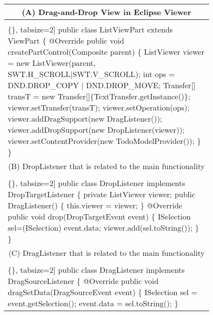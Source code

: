 \begin{figure}[!htb]
 \begin{minipage}{0.47\textwidth}
\scriptsize 
\begin{tabular}{@{}p{}} 
 \hline 
  \multicolumn{1}{c}{(A) Drag-and-Drop View in Eclipse Viewer } \\ \hline
  \vspace{-4mm}
\begin{Verbatim}[commandchars=\\\{\}, tabsize=2]
public class ListViewPart extends ViewPart \{
  @Override
  public void createPartControl(Composite parent) \{
    ListViewer viewer = new ListViewer(parent, 
       SWT.H_SCROLL|SWT.V_SCROLL);
    int ops = DND.DROP_COPY | DND.DROP_MOVE;
    Transfer[] transT = new Transfer[]\{TextTransfer.getInstance()\};
    viewer.setTransfer(transT);
    viewer.setOperation(ops);
    viewer.addDragSupport(new DragListener());
    viewer.addDropSupport(new DropListener(viewer));
    viewer.setContentProvider(new TodoModelProvider());
  \} \}
\end{Verbatim}
\vspace{-4mm}
 \\ \hline
  \multicolumn{1}{c}{(B) DropListener that is related to the main functionality } \\ \hline
    \vspace{-4mm}
\begin{Verbatim}[commandchars=\\\{\}, tabsize=2]
public class DropListener implements DropTargetListener \{
  private ListViewer viewer;
  public DragListener() 
  \{ this.viewer = viewer; \}
 @Override
    public void drop(DropTargetEvent event) \{
        ISelection sel=(ISelection) event.data;
        viewer.add(sel.toString());
   \} \}
 \end{Verbatim}
   \vspace{-4mm}
  \\ \hline
   \multicolumn{1}{c}{(C) DragListener that is related to the main functionality} \\ \hline
  \vspace{-4mm}
\begin{Verbatim}[commandchars=\\\{\}, tabsize=2]
public class DragListener implements DragSourceListener \{
   @Override
  public void dragSetData(DragSourceEvent event) \{
    ISelection sel = event.getSelection();
    event.data = sel.toString();
  \}
\end{Verbatim}
\vspace{-4mm}

\end{tabular}
\end{minipage}
\end{figure}
